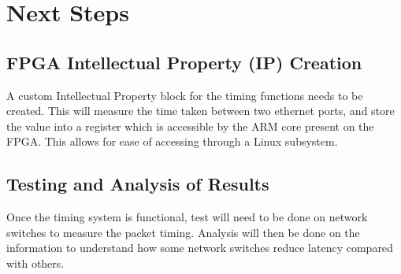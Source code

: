 \chapter{Next Steps}\label{C:nextSteps}

\section{FPGA Intellectual Property (IP) Creation}

\par A custom Intellectual Property block for the timing functions needs to be created. This will measure
the time taken between two ethernet ports, and store the value into a register which is accessible by
the ARM core present on the FPGA. This allows for ease of accessing through a Linux subsystem.

\section{Testing and Analysis of Results}

\par Once the timing system is functional, test will need to be done on network switches to measure the
packet timing. Analysis will then be done on the information to understand how some network
switches reduce latency compared with others.
